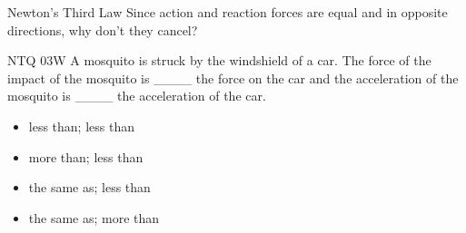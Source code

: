 \documentclass[english]{beamer}
\begin{document}
\begin{frame}{Newton's Third Law}
  Since action and reaction forces are equal and in opposite directions, why don't they cancel?
\end{frame}

\begin{frame}{NTQ 03W}
  A mosquito is struck by the windshield of a car. The force of the impact of the mosquito is \_\_\_\_ the force on the car and the acceleration of the mosquito is \_\_\_\_ the acceleration of the car.
  \begin{itemize}
    \item less than; less than
    \item more than; less than
    \item the same as; less than
    \item the same as; more than
  \end{itemize}
\end{frame}
\end{document}
